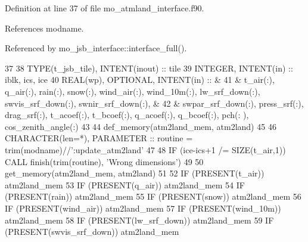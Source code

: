 Definition at line 37 of file mo\+\_\+atmland\+\_\+interface.\+f90.



References modname.



Referenced by mo\+\_\+jsb\+\_\+interface\+::interface\+\_\+full().


\begin{DoxyCode}
37 
38     \textcolor{keywordtype}{TYPE}(t\_jsb\_tile),   \textcolor{keywordtype}{INTENT(inout)} :: tile
39     \textcolor{keywordtype}{INTEGER},            \textcolor{keywordtype}{INTENT(in)}    :: iblk, ics, ice
40     \textcolor{keywordtype}{REAL(wp)}, \textcolor{keywordtype}{OPTIONAL}, \textcolor{keywordtype}{INTENT(in)}    :: &
41       & t\_air(:), q\_air(:), rain(:), snow(:), wind\_air(:), wind\_10m(:), lw\_srf\_down(:), swvis\_srf\_down(:), 
      swnir\_srf\_down(:), &
42       & swpar\_srf\_down(:), press\_srf(:), drag\_srf(:), t\_acoef(:), t\_bcoef(:), q\_acoef(:), q\_bcoef(:), pch(:
      ), cos\_zenith\_angle(:)
43 
44     def\_memory(atm2land\_mem, atm2land)
45 
46     \textcolor{keywordtype}{CHARACTER(len=*)}, \textcolor{keywordtype}{PARAMETER} :: routine = trim(modname)//\textcolor{stringliteral}{':update\_atm2land'}
47 
48     \textcolor{keywordflow}{IF} (ice-ics+1 /= \textcolor{keyword}{SIZE}(t\_air,1)) \textcolor{keyword}{CALL }finish(trim(routine), \textcolor{stringliteral}{'Wrong dimensions'})
49 
50     get\_memory(atm2land\_mem, atm2land)
51 
52     \textcolor{keywordflow}{IF} (\textcolor{keyword}{PRESENT}(t\_air))            atm2land\_mem%
53     \textcolor{keywordflow}{IF} (\textcolor{keyword}{PRESENT}(q\_air))            atm2land\_mem%
54     \textcolor{keywordflow}{IF} (\textcolor{keyword}{PRESENT}(rain))             atm2land\_mem%
55     \textcolor{keywordflow}{IF} (\textcolor{keyword}{PRESENT}(snow))             atm2land\_mem%
56     \textcolor{keywordflow}{IF} (\textcolor{keyword}{PRESENT}(wind\_air))         atm2land\_mem%
57     \textcolor{keywordflow}{IF} (\textcolor{keyword}{PRESENT}(wind\_10m))         atm2land\_mem%
58     \textcolor{keywordflow}{IF} (\textcolor{keyword}{PRESENT}(lw\_srf\_down))      atm2land\_mem%
59     \textcolor{keywordflow}{IF} (\textcolor{keyword}{PRESENT}(swvis\_srf\_down))   atm2land\_mem%

\end{DoxyCode}
